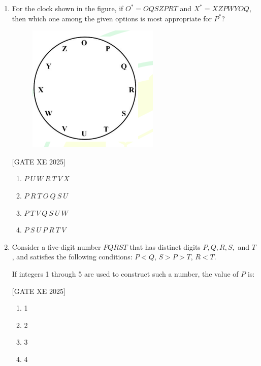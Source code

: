 \documentclass[journal,12pt,onecolumn]{IEEEtran}
\theoremstyle{remark}
\begin{document}
\begin{enumerate}
\item For the clock shown in the figure, if  
$O^* = OQSZPRT$ and $X^* = XZPWYOQ$, then which one among the given options is most appropriate for $P^*$?



\begin{figure}[H]
    \centering
    \includegraphics[width=0.5\columnwidth]{figs/fig4.png}
    \caption{}
    \label{fig:placeholder}
\end{figure}

\hfill [GATE XE 2025]

\begin{multicols}{2}
\begin{enumerate}
\item $P \ U \ W \ R \ T \ V \ X$
\item $P \ R \ T \ O \ Q \ S \ U$
\item $P \ T \ V \ Q \ S \ U \ W$
\item $P \ S \ U \ P \ R \ T \ V$
\end{enumerate}
\end{multicols}

\item Consider a five-digit number $PQRST$ that has distinct digits $P, Q, R, S,$ and $T$, and satisfies the following conditions:  
$P < Q$, $S > P > T$, $R < T$.  

If integers 1 through 5 are used to construct such a number, the value of $P$ is:

\hfill [GATE XE 2025]

\begin{multicols}{2}
\begin{enumerate}
\item 1
\item 2
\item 3
\item 4
\end{enumerate}
\end{multicols}


\end{enumerate}
\end{document}
